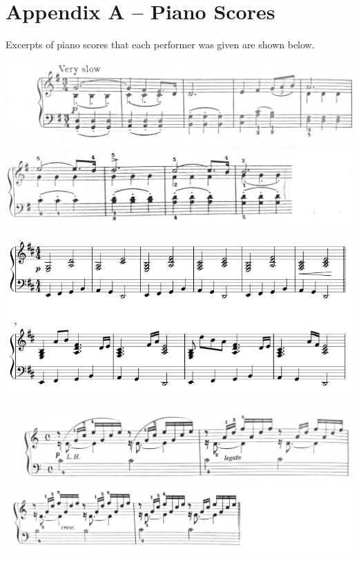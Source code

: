 \documentclass[oneside, a4paper,12pt]{book}
\begin{document}
\appendix

\chapter{Appendix A -- Piano Scores}\label{chapter:appendix a}

Excerpts of piano scores that each performer was given are shown below.

\begin{minipage}{\textwidth}
  \centering
  \includegraphics[scale=0.5]{largo}
\end{minipage}

\begin{minipage}{\textwidth}
  \centering
  \includegraphics[scale=0.5]{sweden}
\end{minipage}

\begin{minipage}{\textwidth}
  \centering
  \includegraphics[scale=0.5]{prelude}
\end{minipage}
\end{document}
